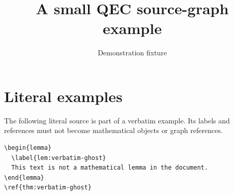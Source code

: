 \documentclass{article}
\title{A small QEC source-graph example}
\author{Demonstration fixture}
\date{}
\newtheorem{lem}[thm]{Lemma}
\begin{document}
\maketitle

% 




\section*{Literal examples}
\label{sec:literal-examples}
The following literal source is part of a verbatim example. Its labels and
references must not become mathematical objects or graph references.

\begin{verbatim}
\begin{lemma}
  \label{lem:verbatim-ghost}
  This text is not a mathematical lemma in the document.
\end{lemma}
\ref{thm:verbatim-ghost}

\end{verbatim}



\end{document}

